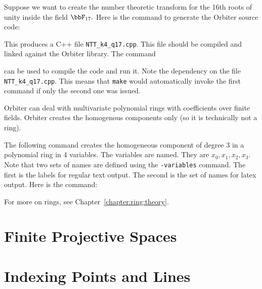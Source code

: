 \bigskip

Suppose we want to create 
the number theoretic transform for the 16th 
roots of unity inside the field $\bbF_{17}.$ 
Here is the command to generate the Orbiter source code:
{\tt

}
This produces a C++ file \verb'NTT_k4_q17.cpp'. 
This file should be compiled and linked against the Orbiter library. 
The command 
{\tt

}
can be used to compile the code and run it. 
Note the dependency on the file \verb'NTT_k4_q17.cpp'. 
This means that \verb'make' would automatically 
invoke the first command if only the second one was issued.

 











Orbiter can deal with multivariate polynomial rings with coefficients 
over finite fields.
Orbiter creates the homogenous components only (so it is technically not a ring).

\bigskip


The following command creates the homogeneous component of degree 3 in 
a polynomial ring in 4 variables. 
The variables are named. They are $x_0,x_1,x_2,x_3.$ 
Note that two sets of names are defined using the \verb'-variables' command. 
The first is the labels for regular text output. 
The second is the set of names for latex output.
Here is the command:
{\tt

}

\bigskip

For more on rings, see Chapter~\ref{chapter:ring:theory}.

\section{Finite Projective Spaces}
\label{sec:FPG}






\bigskip

\clearpage


\section{Indexing Points and Lines}
\label{sec:indexing:points}






